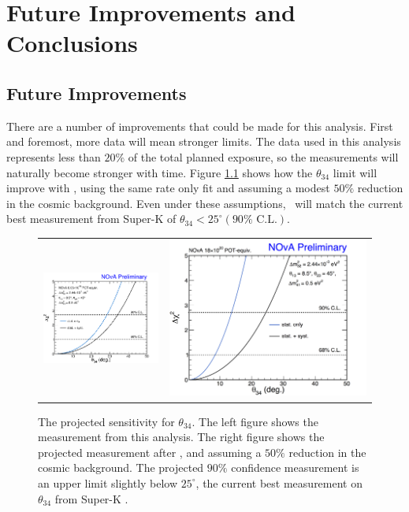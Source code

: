 \chapter{Future Improvements and Conclusions}
\label{conclusion}

\section{Future Improvements}
\label{sec:Future}

There are a number of improvements that could be made for this analysis. First and foremost, more data will mean stronger limits. The data used in this analysis represents less than $20\%$ of the total planned exposure, so the measurements will naturally become stronger with time. Figure \ref{fig:Fit3yr} shows how the $\theta_{34}$ limit will improve with , using the same rate only fit and assuming a modest $50\%$ reduction in the cosmic background. Even under these assumptions, \nova~will match the current best measurement from Super-K \cite{ref:SuperKSterile} of $\theta_{34} < 25^\circ (90\% \mbox{ C.L.})$.
\begin{figure}[htb]
  \centering
  \begin{tabular}{c c}
    \includegraphics[width=.47\textwidth]{figures/Fits/1DTh34.png} &
    \includegraphics[width=.47\textwidth]{figures/Fits/1DTh34_3yr.png} \\
  \end{tabular}
  \caption[Projected Sensitivity for $\theta_{34}$ After .]{The projected sensitivity for $\theta_{34}$. The left figure shows the measurement from this analysis. The right figure shows the projected measurement after , and assuming a $50\%$ reduction in the cosmic background. The projected $90\%$ confidence measurement is an upper limit slightly below $25^\circ$, the current best measurement on $\theta_{34}$ from Super-K \cite{ref:SuperKSterile}.}
  \label{fig:Fit3yr}
\end{figure}

